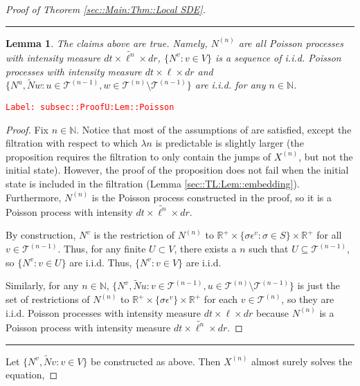 \documentclass[12pt]{article}
\newcommand{\mb}{\mathbb}
\newcommand{\mc}{\mathcal}
\newcommand{\ep}{\epsilon}
\newcommand{\tr}{\textcolor{red}}
\newcommand{\labe}[1]{\tr{\texttt{Label: #1}}}
\newcommand{\ind}{\hspace{24pt}}
\newcommand{\lin}{\rule{\linewidth}{0.4 pt}}
\renewcommand{\v}{v}							%
\newcommand{\vv}{u}								%
\newcommand{\vvv}{w}							%
\renewcommand{\U}{U}							%
\renewcommand{\S}{S}							%
\newcommand{\s}{\sigma}							%
\newcommand{\ev}{\ep}							%
\renewcommand{\t}{t}							%
\newcommand{\X}{X}								%
\newcommand{\vind}[1]{^{#1}}					%
\newcommand{\cind}[1]{_{#1}}					%
\newcommand{\tip}[1]{#1}						%
\newcommand{\tree}{\mc{T}}						%
\newcommand{\sln}[1]{^{(#1)}}						%
\newcommand{\poiss}{N}							%
\newcommand{\Sm}{\ell}							%
\newcommand{\rate}{\lambda}						%
\renewcommand{\r}{r}							%
\newcommand{\alt}[1]{\widetilde{#1}}			%
\newtheorem{lem}[thms]{Lemma}
\begin{document}
\begin{proof}[Proof of Theorem \ref{sec::Main:Thm::Local SDE}]
\lin

\begin{lem}
The claims above are true. Namely, \(\poiss\sln{n}\) are all Poisson processes with intensity measure \(d\t\times\alt{\Sm^{n}}\times d\r\), \(\{\poiss\vind{\v}:\v\in V\}\) is a sequence of i.i.d. Poisson processes with intensity measure \(d\t\times\Sm\times d\r\) and \(\{\poiss\vind{\vv},\alt{\poiss}{\vvv}:\vv\in \tree\sln{n-1},\vvv\in\tree\sln{n}\setminus\tree\sln{n-1}\}\) are i.i.d. for any \(n \in \mb{N}\).

\label{subsec::ProofU:Lem::Poisson}
\end{lem}
\labe{subsec::ProofU:Lem::Poisson}
\begin{proof}

Fix \(n \in \mb{N}\). Notice that most of the assumptions of \cite[Proposition 14.7.I(b)]{DalVer08} are satisfied, except the filtration with respect to which \(\rate{n}\) is predictable is slightly larger (the proposition requires the filtration to only contain the jumps of \(\X\sln{n}\cind{}\tip{}\), but not the initial state). However, the proof of the proposition does not fail when the initial state is included in the filtration (Lemma \ref{sec::TL:Lem::embedding}). Furthermore, \(\poiss\sln{n}\) is the Poisson process constructed in the proof, so it is a Poisson process with intensity \(d\t\times \alt{\Sm^n}\times d\r\).

\ind By construction, \(\poiss\vind{\v}\) is the restriction of \(\poiss\sln{n}\) to \(\mb{R}^+ \times \{\s\ev\vind{\v}: \s\in \S\}\times \mb{R}^+\) for all \(\v\in \tree\sln{n-1}\). Thus, for any finite \(\U \subset V\), there exists a \(n\) such that \(\U \subseteq \tree\sln{n-1}\), so \(\{\poiss\vind{\v}: \v\in \U\}\) are i.i.d. Thus, \(\{\poiss\vind{\v}: \v\in V\}\) are i.i.d.

\ind Similarly, for any \(n \in \mb{N}\), \(\{\poiss\vind{\v},\alt{\poiss}{\vv}: \v \in \tree\sln{n-1},\vv\in\tree\sln{n}\setminus\tree\sln{n-1}\}\) is just the set of restrictions of \(\poiss\sln{n}\) to \(\mb{R}^+\times\{\s\ev\vind{\v}\}\times\mb{R}^+\) for each \(\v\in \tree\sln{n}\), so they are i.i.d. Poisson processes with intensity measure \(d\t\times \Sm\times d\r\) because \(\poiss\sln{n}\) is a Poisson process with intensity measure \(d\t\times\alt{\Sm^n}\times d\r\).
\end{proof}

\lin

Let \(\{\poiss\vind{\v},\alt{\poiss}{\v}:\v\in V\}\) be constructed as above. Then \(\X\sln{n}\cind{}\tip{}\) almost surely solves the equation,


\end{proof}
\end{document}
